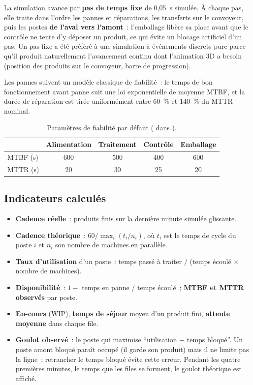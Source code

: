 La simulation avance par \textbf{pas de temps fixe} de 0{,}05~s simulée. À chaque pas, elle traite dans l'ordre les pannes et réparations, les transferts sur le convoyeur, puis les postes \textbf{de l'aval vers l'amont}~: l'emballage libère sa place avant que le contrôle ne tente d'y déposer un produit, ce qui évite un blocage artificiel d'un pas. Un pas fixe a été préféré à une simulation à événements discrets pure parce qu'il produit naturellement l'avancement continu dont l'animation \ac{3D} a besoin (position des produits sur le convoyeur, barre de progression).

Les pannes suivent un modèle classique de fiabilité~: le temps de bon fonctionnement avant panne suit une loi exponentielle de moyenne \ac{MTBF}, et la durée de réparation est tirée uniformément entre 60~\% et 140~\% du \ac{MTTR} nominal.

\begin{table}[H]
\centering
\caption{Paramètres de fiabilité par défaut ( dans ).}
\label{tab:fiabilite}
\begin{tabular}{@{}lcccc@{}}
\toprule
 & \textbf{Alimentation} & \textbf{Traitement} & \textbf{Contrôle} & \textbf{Emballage} \\
\midrule
\ac{MTBF} (s) & 600 & 500 & 400 & 600 \\
\ac{MTTR} (s) & 20 & 30 & 25 & 20 \\
\bottomrule
\end{tabular}
\end{table}

\subsection{Indicateurs calculés}

\begin{itemize}
  \item \textbf{Cadence réelle}~: produits finis sur la dernière minute simulée glissante.
  \item \textbf{Cadence théorique}~: $60 / \max_i (t_i / n_i)$, où $t_i$ est le temps de cycle du poste $i$ et $n_i$ son nombre de machines en parallèle.
  \item \textbf{Taux d'utilisation} d'un poste~: temps passé à traiter / (temps écoulé $\times$ nombre de machines).
  \item \textbf{Disponibilité}~: $1 - $ temps en panne / temps écoulé~; \textbf{\ac{MTBF} et \ac{MTTR} observés} par poste.
  \item \textbf{En-cours} (\ac{WIP}), \textbf{temps de séjour} moyen d'un produit fini, \textbf{attente moyenne} dans chaque file.
  \item \textbf{Goulot observé}~: le poste qui maximise \enquote{utilisation $-$ temps bloqué}. Un poste amont bloqué paraît occupé (il garde son produit) mais il ne limite pas la ligne~; retrancher le temps bloqué évite cette erreur. Pendant les quatre premières minutes, le temps que les files se forment, le goulot théorique est affiché.
\end{itemize}

